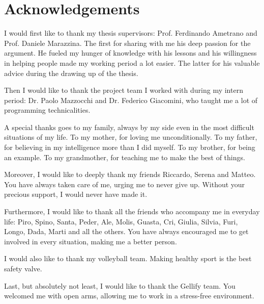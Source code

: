 \chapter{Acknowledgements}
I would first like to thank my thesis supervisors: Prof. Ferdinando Ametrano and Prof. Daniele Marazzina. The first for sharing with me his deep passion for the argument. He fueled my hunger of knowledge with his lessons and his willingness in helping people made my working period a lot easier. The latter for his valuable advice during the drawing up of the thesis.

\bigskip
\noindent
Then I would like to thank the project team I worked with during my intern period: Dr. Paolo Mazzocchi and Dr. Federico Giacomini, who taught me a lot of programming technicalities.

\bigskip
\noindent
A special thanks goes to my family, always by my side even in the most difficult situations of my life. To my mother, for loving me unconditionally. To my father, for believing in my intelligence more than I did myself. To my brother, for being an example. To my grandmother, for teaching me to make the best of things.  

\bigskip
\noindent
Moreover, I would like to deeply thank my friends Riccardo, Serena and Matteo. You have always taken care of me, urging me to never give up. Without your precious support, I would never have made it.

\bigskip
\noindent
Furthermore, I would like to thank all the friends who accompany me in everyday life: Piro, Spino, Santa, Peder, Ale, Molis, Guasta, Cri, Giulia, Silvia, Furi, Longo, Dada, Marti and all the others. You have always encouraged me to get involved in every situation, making me a better person.

\bigskip
\noindent
I would also like to thank my volleyball team. Making healthy sport is the best safety valve.

\bigskip
\noindent
Last, but absolutely not least, I would like to thank the Gellify team. You welcomed me with open arms, allowing me to work in a stress-free environment.